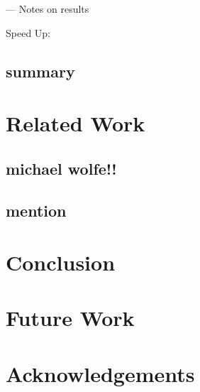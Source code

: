\documentclass[11pt, twocolumn]{article}
\begin{document}
    --- Notes on results


    Speed Up:


    \subsection{summary} %

\section{Related Work} %
    \subsection{michael wolfe!!}
    \subsection{mention} %

\section{Conclusion} %

\section{Future Work} %
\section{Acknowledgements} %
\end{document}
